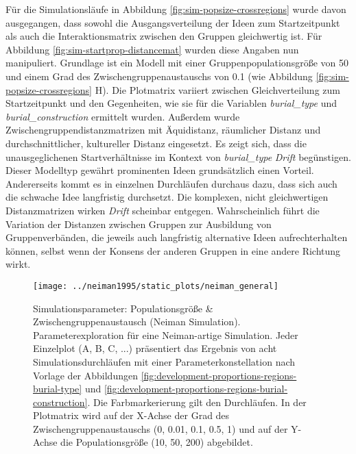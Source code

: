 \documentclass[openany,twoside,twocolumn]{book}
\begin{document}
Für die Simulationsläufe in Abbildung \ref{fig:sim-popsize-crossregions}
wurde davon ausgegangen, dass sowohl die Ausgangsverteilung der Ideen
zum Startzeitpunkt als auch die Interaktionsmatrix zwischen den Gruppen
gleichwertig ist. Für Abbildung \ref{fig:sim-startprop-distancemat}
wurden diese Angaben nun manipuliert. Grundlage ist ein Modell mit einer
Gruppenpopulationsgröße von 50 und einem Grad des
Zwischengruppenaustauschs von 0.1 (wie Abbildung
\ref{fig:sim-popsize-crossregions} H). Die Plotmatrix variiert zwischen
Gleichverteilung zum Startzeitpunkt und den Gegenheiten, wie sie für die
Variablen \emph{burial\_type} und \emph{burial\_construction} ermittelt
wurden. Außerdem wurde Zwischengruppendistanzmatrizen mit Äquidistanz,
räumlicher Distanz und durchschnittlicher, kultureller Distanz
eingesetzt. Es zeigt sich, dass die unausgeglichenen Startverhältnisse
im Kontext von \emph{burial\_type} \emph{Drift} begünstigen. Dieser
Modelltyp gewährt prominenten Ideen grundsätzlich einen Vorteil.
Andererseits kommt es in einzelnen Durchläufen durchaus dazu, dass sich
auch die schwache Idee langfristig durchsetzt. Die komplexen, nicht
gleichwertigen Distanzmatrizen wirken \emph{Drift} scheinbar entgegen.
Wahrscheinlich führt die Variation der Distanzen zwischen Gruppen zur
Ausbildung von Gruppenverbänden, die jeweils auch langfristig
alternative Ideen aufrechterhalten können, selbst wenn der Konsens der
anderen Gruppen in eine andere Richtung wirkt.

\begin{figure}[!t]

{\centering \texttt{[image: ../neiman1995/static\_plots/neiman\_general]} 

}

\caption[Simulationsparameter: Populationsgröße \& Zwischengruppenaustausch (Neiman Simulation)]{Simulationsparameter: Populationsgröße \& Zwischengruppenaustausch (Neiman Simulation). Parameterexploration für eine Neiman-artige Simulation. Jeder Einzelplot (A, B, C, ...) präsentiert das Ergebnis von acht Simulationsdurchläufen mit einer Parameterkonstellation nach Vorlage der Abbildungen \ref{fig:development-proportions-regions-burial-type} und \ref{fig:development-proportions-regions-burial-construction}. Die Farbmarkerierung gilt den Durchläufen. In der Plotmatrix wird auf der X-Achse der Grad des Zwischengruppenaustauschs (0, 0.01, 0.1, 0.5, 1) und auf der Y-Achse die Populationsgröße (10, 50, 200) abgebildet.}\label{fig:neiman-general}
\end{figure}
\end{document}
